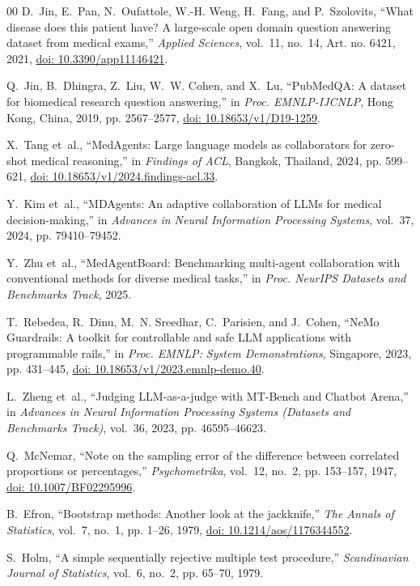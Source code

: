 \documentclass[conference]{IEEEtran}
\begin{document}
\begin{thebibliography}{00}
D.~Jin, E.~Pan, N.~Oufattole, W.-H. Weng, H.~Fang, and P.~Szolovits, ``What disease does this patient have? A large-scale open domain question answering dataset from medical exams,'' \emph{Applied Sciences}, vol.~11, no.~14, Art. no. 6421, 2021, \href{https://doi.org/10.3390/app11146421}{doi: 10.3390/app11146421}.

Q.~Jin, B.~Dhingra, Z.~Liu, W.~W. Cohen, and X.~Lu, ``PubMedQA: A dataset for biomedical research question answering,'' in \emph{Proc. EMNLP-IJCNLP}, Hong Kong, China, 2019, pp. 2567--2577, \href{https://doi.org/10.18653/v1/D19-1259}{doi: 10.18653/v1/D19-1259}.

X.~Tang et~al., ``MedAgents: Large language models as collaborators for zero-shot medical reasoning,'' in \emph{Findings of ACL}, Bangkok, Thailand, 2024, pp. 599--621, \href{https://doi.org/10.18653/v1/2024.findings-acl.33}{doi: 10.18653/v1/2024.findings-acl.33}.

Y.~Kim et~al., ``MDAgents: An adaptive collaboration of LLMs for medical decision-making,'' in \emph{Advances in Neural Information Processing Systems}, vol.~37, 2024, pp. 79410--79452.

Y.~Zhu et~al., ``MedAgentBoard: Benchmarking multi-agent collaboration with conventional methods for diverse medical tasks,'' in \emph{Proc. NeurIPS Datasets and Benchmarks Track}, 2025.

T.~Rebedea, R.~Dinu, M.~N. Sreedhar, C.~Parisien, and J.~Cohen, ``NeMo Guardrails: A toolkit for controllable and safe LLM applications with programmable rails,'' in \emph{Proc. EMNLP: System Demonstrations}, Singapore, 2023, pp. 431--445, \href{https://doi.org/10.18653/v1/2023.emnlp-demo.40}{doi: 10.18653/v1/2023.emnlp-demo.40}.

L.~Zheng et~al., ``Judging LLM-as-a-judge with MT-Bench and Chatbot Arena,'' in \emph{Advances in Neural Information Processing Systems (Datasets and Benchmarks Track)}, vol.~36, 2023, pp. 46595--46623.

Q.~McNemar, ``Note on the sampling error of the difference between correlated proportions or percentages,'' \emph{Psychometrika}, vol.~12, no.~2, pp. 153--157, 1947, \href{https://doi.org/10.1007/BF02295996}{doi: 10.1007/BF02295996}.

B.~Efron, ``Bootstrap methods: Another look at the jackknife,'' \emph{The Annals of Statistics}, vol.~7, no.~1, pp. 1--26, 1979, \href{https://doi.org/10.1214/aos/1176344552}{doi: 10.1214/aos/1176344552}.

S.~Holm, ``A simple sequentially rejective multiple test procedure,'' \emph{Scandinavian Journal of Statistics}, vol.~6, no.~2, pp. 65--70, 1979.
\end{thebibliography}
\end{document}
